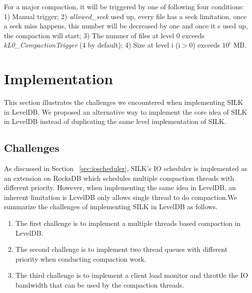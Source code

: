 \documentclass[letter,twocolumn,10pt]{article}
\begin{document}
For a major compaction, it will be triggered by one of following four conditions: 1) Manual trigger; 2) \textit{allowed\_seek} used up, every file has a seek limitation, once a seek miss happens, this number will be decreased by one and once it s used up, the compaction will start; 3) The numner of files at level 0 exceeds \textit{kL0\_CompactionTrigger} (4 by default); 4) Size at level i (i$>$0) exceeds $10^i$ MB.
\section{Implementation}
\label{sec:implementaion}
This section illustrates the challenges we encountered when implementing SILK in LevelDB. We proposed an alternative way to implement the core idea of SILK in LevelDB instead of duplicating the same level implementation of SILK.
 
\subsection {Challenges}
As discussed in Section ~\ref{sec:ioscheduler}, SILK's IO scheduler is implemented as an extension on RocksDB which schedules multiple compaction threads with different priority. However, when implementing the same idea in LevelDB, an inherent limitation is LevelDB only allows single thread to do compaction.We summarize the challenges of implementing SILK in LevelDB as follows.   
\begin{enumerate}
\item The first challenge is to implement a multiple threads based compaction in LevelDB.
\item The second challenge is to implement two thread queues with different priority when conducting compaction work.
\item The third challenge is to implement a client load monitor and throttle the IO bandwidth that can be used by the compaction threads.
\end{enumerate}
\end{document}
